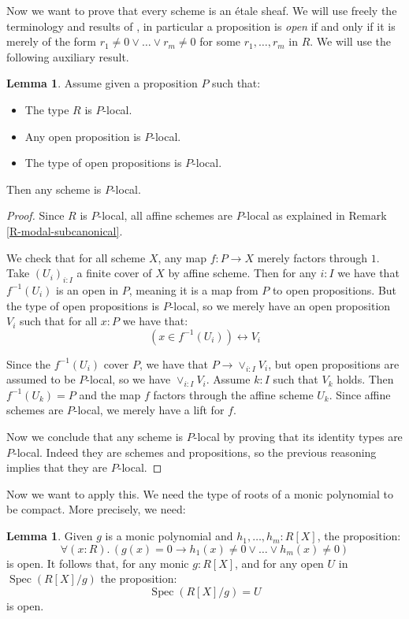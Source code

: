 \documentclass[10pt,a4paper]{article}
\theoremstyle{definition}
\newtheorem{lemma}[theorem]{Lemma}
\DeclareMathOperator{\Spec}{Spec}
\begin{document}
Now we want to prove that every scheme is an étale sheaf. We will use freely the terminology and results of \cite{draft}, in particular a proposition is {\em open} if and only if it is merely of the form $r_1\neq 0\vee\dots\vee r_m\neq 0$ for some $r_1,\dots,r_m$ in $R$. We will use the following auxiliary result.

\begin{lemma}\label{scheme-are-sheaf-from-affine}
Assume given a proposition $P$ such that:
\begin{itemize}
\item The type $R$ is $P$-local.
\item Any open proposition is $P$-local.
\item The type of open propositions is $P$-local.
\end{itemize}
Then any scheme is $P$-local.
\end{lemma}

\begin{proof}
Since $R$ is $P$-local, all affine schemes are $P$-local as explained in Remark \ref{R-modal-subcanonical}.

We check that for all scheme $X$, any map $f:P\to X$ merely factors through $1$. Take $(U_i)_{i:I}$ a finite cover of $X$ by affine scheme. Then for any $i:I$ we have that $f^{-1}(U_i)$ is an open in $P$, meaning it is a map from $P$ to open propositions. But the type of open propositions is $P$-local, so we merely have an open proposition $V_i$ such that for all $x:P$ we have that:
\[(x\in f^{-1}(U_i) )\leftrightarrow V_i\]

Since the $f^{-1}(U_i)$ cover $P$, we have that $P\to \lor_{i:I} V_i$, but open propositions are assumed to be $P$-local, so we have $\lor_{i:I} V_i$.
Assume $k:I$ such that $V_k$ holds. Then $f^{-1}(U_k) = P$ and the map $f$ factors through the affine scheme $U_k$. Since affine schemes are $P$-local, we merely have a lift for $f$.

Now we conclude that any scheme is $P$-local by proving that its identity types are $P$-local. Indeed they are schemes and propositions, so the previous reasoning implies that they are $P$-local.
\end{proof}

Now we want to apply this. We need the type of roots of a monic polynomial to be compact. More precisely, we need:

\begin{lemma}\label{roots-monic-proper}
  Given $g$ is a monic polynomial and $h_1,\dots,h_m:R[X]$, the proposition:
  \[
  \forall(x:R).\, (g(x)=0\to h_1(x)\neq 0\vee\dots\vee h_m(x)\neq 0)
  \] 
  is open. It follows that, for any monic $g:R[X]$, and for any open $U$ in $\Spec(R[X]/g)$ the proposition:
  \[\Spec(R[X]/g) = U\]
is open.
\end{lemma}
\end{document}

